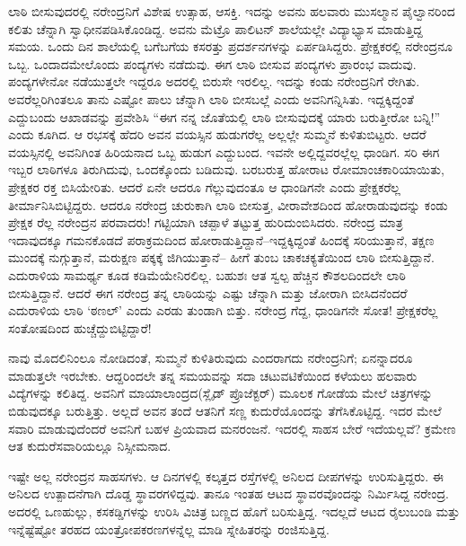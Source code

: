 ಲಾಠಿ ಬೀಸುವುದರಲ್ಲಿ ನರೇಂದ್ರನಿಗೆ ವಿಶೇಷ ಉತ್ಸಾಹ, ಆಸಕ್ತಿ. ಇದನ್ನು ಅವನು ಹಲವಾರು ಮುಸಲ್ಮಾನ ಪೈಲ್ವಾನರಿಂದ ಕಲಿತು ಚೆನ್ನಾಗಿ ಸ್ವಾಧೀನಪಡಿಸಿಕೊಂಡಿದ್ದ. ಅವನು ಮೆಟ್ರೊ ಪಾಲಿಟನ್ ಶಾಲೆಯಲ್ಲೇ ವಿದ್ಯಾಭ್ಯಾಸ ಮಾಡುತ್ತಿದ್ದ ಸಮಯ. ಒಂದು ದಿನ ಶಾಲೆಯಲ್ಲಿ ಬಗೆಬಗೆಯ ಕಸರತ್ತು ಪ್ರದರ್ಶನಗಳನ್ನು ಏರ್ಪಡಿಸಿದ್ದರು. ಪ್ರೇಕ್ಷಕರಲ್ಲಿ ನರೇಂದ್ರನೂ ಒಬ್ಬ. ಒಂದಾದಮೇಲೊಂದು ಪಂದ್ಯಗಳು ನಡೆದುವು. ಈಗ ಲಾಠಿ ಬೀಸುವ ಪಂದ್ಯಗಳು ಪ್ರಾರಂಭ ವಾದುವು. ಪಂದ್ಯಗಳೇನೋ ನಡೆಯುತ್ತಲೇ ಇದ್ದರೂ ಅದರಲ್ಲಿ ಬಿರುಸೇ ಇರಲಿಲ್ಲ. ಇದನ್ನು ಕಂಡು ನರೇಂದ್ರನಿಗೆ ರೇಗಿತು. ಅವರೆಲ್ಲರಿಗಿಂತಲೂ ತಾನು ಎಷ್ಟೋ ಪಾಲು ಚೆನ್ನಾಗಿ ಲಾಠಿ ಬೀಸಬಲ್ಲೆ ಎಂದು ಅವನಿಗನ್ನಿಸಿತು. ಇದ್ದಕ್ಕಿದ್ದಂತೆ ಎದ್ದುಬಂದು ಆಖಾಡವನ್ನು ಪ್ರವೇಶಿಸಿ “ಈಗ ನನ್ನ ಜೊತೆಯಲ್ಲಿ ಲಾಠಿ ಬೀಸುವುದಕ್ಕೆ ಯಾರು ಬರುತ್ತೀರೋ ಬನ್ನಿ!” ಎಂದು ಕೂಗಿದ. ಆ ರಭಸಕ್ಕೆ ಹೆದರಿ ಅವನ ವಯಸ್ಸಿನ ಹುಡುಗರೆಲ್ಲ ಅಲ್ಲಲ್ಲೇ ಸುಮ್ಮನೆ ಕುಳಿತುಬಿಟ್ಟರು. ಆದರೆ ವಯಸ್ಸಿನಲ್ಲಿ ಅವನಿಗಿಂತ ಹಿರಿಯನಾದ ಒಬ್ಬ ಹುಡುಗ ಎದ್ದುಬಂದ. ಇವನೇ ಅಲ್ಲಿದ್ದವರಲ್ಲೆಲ್ಲ ಧಾಂಡಿಗ. ಸರಿ ಈಗ ಇಬ್ಬರ ಲಾಠಿಗಳೂ ತಿರುಗಿದುವು, ಒಂದಕ್ಕೊಂದು ಬಡಿದುವು. ಬರಬರುತ್ತ ಹೋರಾಟ ರೋಮಾಂಚಕಾರಿಯಾಯಿತು, ಪ್ರೇಕ್ಷಕರ ರಕ್ತ ಬಿಸಿಯೇರಿತು. ಆದರೆ ಏನೇ ಆದರೂ ಗೆಲ್ಲುವುದಂತೂ ಆ ಧಾಂಡಿಗನೇ ಎಂದು ಪ್ರೇಕ್ಷಕರೆಲ್ಲ ತೀರ್ಮಾನಿಸಿಬಿಟ್ಟಿದ್ದರು. ಆದರೂ ನರೇಂದ್ರ ಚುರುಕಾಗಿ ಲಾಠಿ ಬೀಸುತ್ತ, ವೀರಾವೇಶದಿಂದ ಹೋರಾಡುವುದನ್ನು ಕಂಡು ಪ್ರೇಕ್ಷಕ ರೆಲ್ಲ ನರೇಂದ್ರನ ಪರವಾದರು! ಗಟ್ಟಿಯಾಗಿ ಚಪ್ಪಾಳೆ ತಟ್ಟುತ್ತ ಹುರಿದುಂಬಿಸಿದರು. ನರೇಂದ್ರ ಮಾತ್ರ ಇದಾವುದಕ್ಕೂ ಗಮನಕೊಡದೆ ಪರಾಕ್ರಮದಿಂದ ಹೋರಾಡುತ್ತಿದ್ದಾನೆ–ಇದ್ದಕ್ಕಿದ್ದಂತೆ ಹಿಂದಕ್ಕೆ ಸರಿಯುತ್ತಾನೆ, ತಕ್ಷಣ ಮುಂದಕ್ಕೆ ನುಗ್ಗುತ್ತಾನೆ, ಮರುಕ್ಷಣ ಪಕ್ಕಕ್ಕೆ ಜಿಗಿಯುತ್ತಾನೆ– ಹೀಗೆ ತುಂಬ ಚಾಕಚಕ್ಯತೆಯಿಂದ ಲಾಠಿ ಬೀಸುತ್ತಿದ್ದಾನೆ. ಎದುರಾಳಿಯ ಸಾಮರ್ಥ್ಯ ಕೂಡ ಕಡಿಮೆಯೇನಿರಲಿಲ್ಲ. ಬಹುಶಃ ಆತ ಸ್ವಲ್ಪ ಹೆಚ್ಚಿನ ಕೌಶಲದಿಂದಲೇ ಲಾಠಿ ಬೀಸುತ್ತಿದ್ದಾನೆ. ಆದರೆ ಈಗ ನರೇಂದ್ರ ತನ್ನ ಲಾಠಿಯನ್ನು ಎಷ್ಟು ಚೆನ್ನಾಗಿ ಮತ್ತು ಜೋರಾಗಿ ಬೀಸಿದನೆಂದರೆ ಎದುರಾಳಿಯ ಲಾಠಿ ‘ಠಣಲ್​’ ಎಂದು ಎರಡು ತುಂಡಾಗಿ ಬಿತ್ತು. ನರೇಂದ್ರ ಗೆದ್ದ, ಧಾಂಡಿಗನೇ ಸೋತ! ಪ್ರೇಕ್ಷಕರೆಲ್ಲ ಸಂತೋಷದಿಂದ ಹುಚ್ಚೆದ್ದುಬಿಟ್ಟಿದ್ದಾರೆ!

ನಾವು ಮೊದಲಿನಿಂಲೂ ನೋಡಿದಂತೆ, ಸುಮ್ಮನೆ ಕುಳಿತಿರುವುದು ಎಂದರಾಗದು ನರೇಂದ್ರನಿಗೆ; ಏನನ್ನಾದರೂ ಮಾಡುತ್ತಲೇ ಇರಬೇಕು. ಆದ್ದರಿಂದಲೇ ತನ್ನ ಸಮಯವನ್ನು ಸದಾ ಚಟುವಟಿಕೆಯಿಂದ ಕಳೆಯಲು ಹಲವಾರು ವಿದ್ಯೆಗಳನ್ನು ಕಲಿತಿದ್ದ. ಅವನಿಗೆ ಮಾಯಾಲಾಂದ್ರದ(ಸ್ಲೈಡ್ ಪ್ರೊಜೆಕ್ಟರ್​) ಮೂಲಕ ಗೋಡೆಯ ಮೇಲೆ ಚಿತ್ರಗಳನ್ನು ಬಿಡುವುದಕ್ಕೂ ಬರುತ್ತಿತ್ತು. ಅಲ್ಲದೆ ಅವನ ತಂದೆ ಆತನಿಗೆ ಸಣ್ಣ ಕುದುರೆಯೊಂದನ್ನು ತೆಗೆಸಿಕೊಟ್ಟಿದ್ದ. ಇದರ ಮೇಲೆ ಸವಾರಿ ಮಾಡುವುದೆಂದರೆ ಅವನಿಗೆ ಬಹಳ ಪ್ರಿಯವಾದ ಮನರಂಜನೆ. ಇದರಲ್ಲಿ ಸಾಹಸ ಬೇರೆ ಇದೆಯಲ್ಲವೆ? ಕ್ರಮೇಣ ಆತ ಕುದುರೆಸವಾರಿಯಲ್ಲೂ ನಿಸ್ಸೀಮನಾದ.

ಇಷ್ಟೇ ಅಲ್ಲ ನರೇಂದ್ರನ ಸಾಹಸಗಳು. ಆ ದಿನಗಳಲ್ಲಿ ಕಲ್ಕತ್ತದ ರಸ್ತೆಗಳಲ್ಲಿ ಅನಿಲದ ದೀಪಗಳನ್ನು ಉರಿಸುತ್ತಿದ್ದರು. ಈ ಅನಿಲದ ಉತ್ಪಾದನೆಗಾಗಿ ದೊಡ್ಡ ಸ್ಥಾವರಗಳಿದ್ದವು. ತಾನೂ ಇಂತಹ ಆಟದ ಸ್ಥಾವರವೊಂದನ್ನು ನಿರ್ಮಿಸಿದ್ದ ನರೇಂದ್ರ. ಅದರಲ್ಲಿ ಒಣಹುಲ್ಲು, ಕಸಕಡ್ಡಿಗಳನ್ನು ಉರಿಸಿ ವಿಚಿತ್ರ ಬಣ್ಣದ ಹೊಗೆ ಬರಿಸುತ್ತಿದ್ದ. ಇದಲ್ಲದೆ ಆಟದ ರೈಲುಬಂಡಿ ಮತ್ತು ಇನ್ನೆಷ್ಟೆಷ್ಟೋ ತರಹದ ಯಂತ್ರೋಪಕರಣಗಳನ್ನೆಲ್ಲ ಮಾಡಿ ಸ್ನೇಹಿತರನ್ನು ರಂಜಿಸುತ್ತಿದ್ದ.

